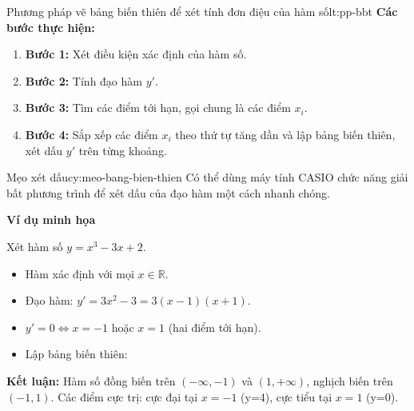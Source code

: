 


\begin{lythuyetbox}{Phương pháp vẽ bảng biến thiên để xét tính đơn điệu của hàm số}{lt:pp-bbt}
\textbf{Các bước thực hiện:}

\begin{enumerate}
    \item \textbf{Bước 1:} Xét điều kiện xác định của hàm số.
    \item \textbf{Bước 2:} Tính đạo hàm $y'$.
    \item \textbf{Bước 3:} Tìm các điểm tới hạn, gọi chung là các điểm $x_i$.
    \item \textbf{Bước 4:} Sắp xếp các điểm $x_i$ theo thứ tự tăng dần và lập bảng biến thiên, xét dấu $y'$ trên từng khoảng.
\end{enumerate}

\begin{chuy}{Mẹo xét dấu}{cy:meo-bang-bien-thien}
    Có thể dùng máy tính CASIO chức năng giải bất phương trình để xét dấu của đạo hàm một cách nhanh chóng.
\end{chuy}

\textbf{Ví dụ minh họa}

Xét hàm số $y = x^3 - 3x + 2$.

\begin{itemize}
    \item Hàm xác định với mọi $x \in \mathbb{R}$.
    \item Đạo hàm: $y' = 3x^2 - 3 = 3(x-1)(x+1)$.
    \item $y' = 0 \Leftrightarrow x = -1$ hoặc $x = 1$ (hai điểm tới hạn).
    \item Lập bảng biến thiên:
\end{itemize}

\begin{center}
\end{center}

\textbf{Kết luận:} Hàm số đồng biến trên $(-\infty, -1)$ và $(1, +\infty)$, nghịch biến trên $(-1, 1)$. Các điểm cực trị: cực đại tại $x = -1$ (y=4), cực tiểu tại $x = 1$ (y=0).

\end{lythuyetbox}

